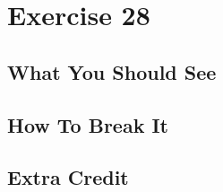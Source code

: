 \chapter{Exercise 28}


\section{What You Should See}


\section{How To Break It}


\section{Extra Credit}



